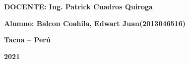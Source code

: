 \documentclass{article}
\begin{document}
\begin{titlepage}
\begin{center}
\vspace*{0.3in}
\begin{Large}
\textbf{DOCENTE: Ing. Patrick Cuadros Quiroga} \\
\end{Large}

\vspace*{0.2in}
\vspace*{0.1in}
\begin{large}

\begin{Large}
\textbf{Alumno: Balcon Coahila, Edwart Juan\hfill	(2013046516) } \\
\end{Large}

\vspace*{0.15in}
\begin{Large}
\textbf{Tacna – Perú} \\
\end{Large}

\vspace*{0.05in}
\begin{Large}
\textbf{2021 } \\
\end{Large}

\end{large}
\end{center}

\end{titlepage}


\newpage
    \section{}
\end{document}
